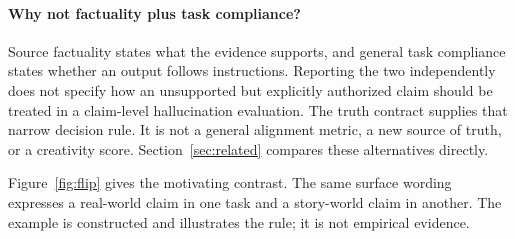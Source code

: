 \documentclass{clv2025}
\begin{document}
\paragraph{Why not factuality plus task compliance?}
Source factuality states what the evidence supports, and general task compliance states whether an output follows instructions.
Reporting the two independently does not specify how an unsupported but explicitly authorized claim should be treated in a claim-level hallucination evaluation.
The truth contract supplies that narrow decision rule.
It is not a general alignment metric, a new source of truth, or a creativity score.
Section~\ref{sec:related} compares these alternatives directly.

Figure~\ref{fig:flip} gives the motivating contrast.
The same surface wording expresses a real-world claim in one task and a story-world claim in another.
The example is constructed and illustrates the rule; it is not empirical evidence.
\end{document}
